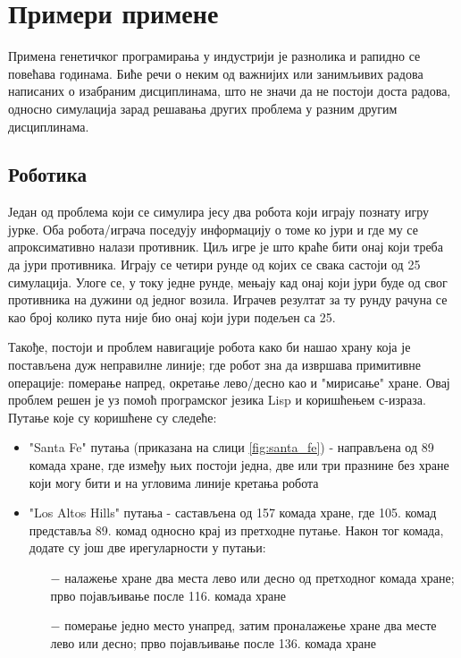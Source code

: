 \documentclass[a4paper]{article}
\begin{document}
\section{Примери примене}
Примена генетичког програмирања у индустрији је разнолика и рапидно се повећава годинама. Биће речи о неким од важнијих или занимљивих радова написаних о изабраним дисциплинама, што не значи да не постоји доста радова, односно симулација зарад решавања других проблема у разним другим дисциплинама.
\subsection{Роботика}
Један од проблема који се симулира јесу два робота који играју познату игру јурке. Оба робота/играча поседују информацију о томе ко јури и где му се апроксимативно налази противник. Циљ игре је што краће бити онај који треба да јури противника. Играју се четири рунде од којих се свака састоји од 25 симулација. Улоге се, у току једне рунде, мењају кад онај који јури буде од свог противника на дужини од једног возила. Играчев резултат за ту рунду рачуна се као број колико пута није био онај који јури подељен са 25. \cite{tag}

Такође, постоји и проблем навигације робота како би нашао храну која је постављена дуж неправилне линије; где робот зна да извршава примитивне операције: померање напред, окретање лево/десно као и "мирисање" хране.
Овај проблем решен је уз помоћ програмског језика Lisp и коришћењем с-израза. \cite{lisp} Путање које су коришћене су следеће:
\begin{itemize}
	\item "Santa Fe" путања (приказана на слици \ref{fig:santa_fe}) - направљена од 89 комада хране, где између њих постоји једна, две или три празнине без хране који могу бити и на угловима линије кретања робота
	\item "Los Altos Hills" путања - састављена од 157 комада хране, где 105. комад представља 89. комад односно крај из претходне путање. Након тог комада, додате су још две ирегуларности у путањи:
	\begin{itemize}
		\item[$-$] налажење хране два места лево или десно од претходног комада хране; прво појављивање после 116. комада хране 
		\item[$-$] померање једно место унапред, затим проналажење хране два месте лево или десно; прво појављивање после 136. комада хране
	\end{itemize}
\end{itemize}
\end{document}
